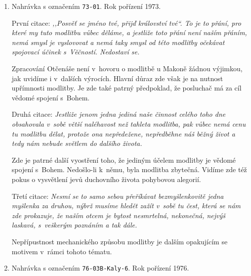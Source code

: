 \begin{enumerate}
  \item{
    Nahrávka s označením \texttt{73-01}.
    Rok pořízení 1973.

    První citace: \textit{%
      ,,Posvěť se jméno tvé, přijď království tvé``. To je to přání, pro které
      my tuto modlitbu vůbec děláme, a jestliže toto přání není naším přáním,
      nemá smysl je vyslovovat a nemá taky smysl od této modlitby očekávat
      spojovací účinek s~Věčností. Nedostaví se.
    }

    Zpracování Otčenáše není v~hovoru o modlitbě u Makoně žádnou výjimkou, jak
    uvidíme i v~dalších výrocích. Hlavní důraz zde však je na nutnost upřímnosti
    modlitby. Je zde také patrný předpoklad, že posluchač má za cíl vědomé
    spojení s~Bohem.

    Druhá citace: \textit{%
      Jestliže jenom jedna jediná naše činnost celého toho dne obsahovala v~sobě
      větší naléhavost než tahleta modlitba, pak vůbec nemá cenu tu modlitbu
      dělat, protože ona nepředežene, nepředběhne náš běžný život a tedy nám
      nebude světlem do dalšího života.
    }

    Zde je patrné další vyostření toho, že jediným účelem modlitby je vědomé
    spojení s~Bohem. Nedošlo-li k~němu, byla modlitba zbytečná. Vidíme zde též
    pokus o vysvětlení jevů duchovního života pohybovou alegorií.

    Třetí citace: \textit{%
      Nesmí se to samo sebou přeříkávat bezmyšlenkovitě jedna myšlenka za
      druhou, nýbrž musíme hledět zažít v~sobě tu čest, která se nám zde
      prokazuje, že naším otcem je bytost nesmrtelná, nekonečná, nejvýš laskavá,
      s~veškerým poznáním a tak dále.
    }

    Nepřípustnost mechanického způsobu modlitby je dalším opakujícím se motivem
    v~rámci tohoto tématu.
  }
  \item{
    Nahrávka s označením \texttt{76-03B-Kaly-6}.
    Rok pořízení 1976.

}
\end{enumerate}
